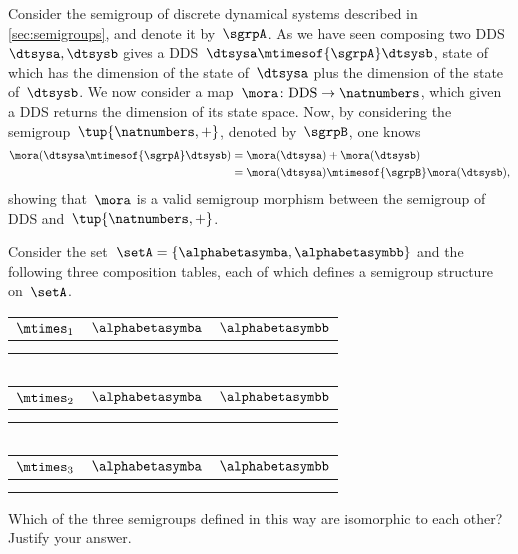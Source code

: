 \begin{example}
	Consider the semigroup of discrete dynamical systems described in \cref{sec:semigroups}, and denote it by~$\sgrpA$.
	As we have seen composing two DDS~$\dtsysa,\dtsysb$ gives a DDS~$\dtsysa \mtimesof{\sgrpA} \dtsysb$, state of which has the dimension of the state of~$\dtsysa$ plus the dimension of the state of~$\dtsysb$.
	We now consider a map~$\mora\colon \text{DDS} \to \natnumbers$, which given a DDS returns the dimension of its state space.
	Now, by considering the semigroup~$\tup{\natnumbers,+}$, denoted by~$\sgrpB$, one knows
	\begin{equation*}
		\begin{aligned}
			\mora(\dtsysa\mtimesof{\sgrpA}  \dtsysb) & =\mora(\dtsysa)+\mora(\dtsysb)                   \\
			                                         & =\mora(\dtsysa)\mtimesof{\sgrpB} \mora(\dtsysb),
		\end{aligned}
	\end{equation*}
	showing that~$\mora$ is a valid semigroup morphism between the semigroup of DDS and~$\tup{\natnumbers,+}$.
\end{example}
\vfill%
\begin{gradedexercise}
	\label{ex:IsoViaTables}
	\label{ex:sem-compare-tables}
	Consider the set~$\setA = \{ \alphabetasymba, \alphabetasymbb \}$ and the following three composition tables, each of which defines a semigroup structure on~$\setA$.
	\begin{center}
		\begin{tabular}{c|cc}
			$\mtimes_1$     & $\alphabetasymba$ & $\alphabetasymbb$ \\
			\hline
			\alphabetasymba & \alphabetasymba   & \alphabetasymba   \\
			\alphabetasymbb & \alphabetasymba   & \alphabetasymbb
		\end{tabular}
		$\quad$
		\begin{tabular}{c|cc}
			$\mtimes_2$     & $\alphabetasymba$ & $\alphabetasymbb$ \\
			\hline
			\alphabetasymba & \alphabetasymba   & \alphabetasymbb   \\
			\alphabetasymbb & \alphabetasymbb   & \alphabetasymba
		\end{tabular}
		$\quad$
		\begin{tabular}{c|cc}
			$\mtimes_3$     & $\alphabetasymba$ & $\alphabetasymbb$ \\
			\hline
			\alphabetasymba & \alphabetasymba   & \alphabetasymbb   \\
			\alphabetasymbb & \alphabetasymbb   & \alphabetasymbb
		\end{tabular}
	\end{center}
	Which of the three semigroups defined in this way are isomorphic to each other?
	Justify your answer.
\end{gradedexercise}

